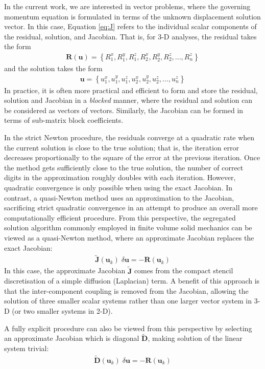 \documentclass[sn-mathphys,Numbered,draft]{sn-jnl}%
\newcommand{\bb}{\boldsymbol}
\begin{document}
In the current work, we are interested in vector problems, where the governing momentum equation is formulated in terms of the unknown displacement solution vector.
In this case, Equation \ref{eq:J} refers to the individual scalar components of the residual, solution, and Jacobian.
That is, for 3-D analyses, the residual takes the form
\begin{eqnarray}
	\bb{R}(\bb{u}) = \left\{ R_1^x, R_1^y, R_1^z, R_2^x, R_2^y, R_2^z, ..., R_n^z \right\}
\end{eqnarray}
and the solution takes the form
\begin{eqnarray}
	\bb{u} = \left\{ u_1^x, u_1^y, u_1^z, u_2^x, u_2^y, u_2^z, ..., u_n^z \right\}
\end{eqnarray}
In practice, it is often more practical and efficient to form and store the residual, solution and Jacobian in a \emph{blocked} manner, where the residual and solution can be considered as vectors of vectors.
Similarly, the Jacobian can be formed in terms of sub-matrix block coefficients.

In the strict Newton procedure, the residuals converge at a quadratic rate when the current solution is close to the true solution; that is, the iteration error decreases proportionally to the square of the error at the previous iteration.
Once the method gets sufficiently close to the true solution, the number of correct digits in the approximation roughly doubles with each iteration. 
However, quadratic convergence is only possible when using the exact Jacobian.
In contrast, a quasi-Newton method uses an approximation to the Jacobian, sacrificing strict quadratic convergence in an attempt to produce an overall more computationally efficient procedure.
From this perspective, the segregated solution algorithm commonly employed in finite volume solid mechanics can be viewed as a quasi-Newton method, where an approximate Jacobian replaces the exact Jacobian: 
\begin{eqnarray} \label{eq:Seg}
    \bb{\tilde{J}}(\bb{u}_k) \;\delta \bb{u} = -\bb{R}(\bb{u}_k)
\end{eqnarray}
In this case, the approximate Jacobian $\bb{\tilde{J}}$ comes from the compact stencil discretisation of a simple diffusion (Laplacian) term.
A benefit of this approach is that the inter-component coupling is removed from the Jacobian, allowing the solution of three smaller scalar systems rather than one larger vector system in 3-D (or two smaller systems in 2-D).

A fully explicit procedure can also be viewed from this perspective by selecting an approximate Jacobian which is diagonal $\bb{\tilde{D}}$, making solution of the linear system trivial:
\begin{eqnarray} \label{eq:exp}
    \bb{\tilde{D}}(\bb{u}_k) \;\delta \bb{u} = -\bb{R}(\bb{u}_k)
\end{eqnarray}
\end{document}
